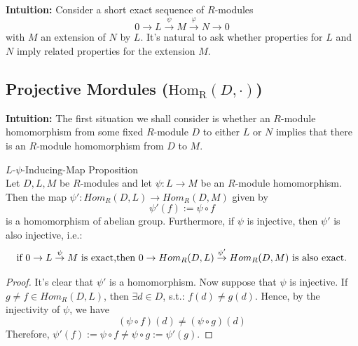 \noindent\textbf{Intuition:} Consider a short exact sequence of $R$-modules
$$0 \to L \overset{\psi}{\to} M \overset{\varphi}{\to} N \to 0$$
with $M$ an extension of $N$ by $L$. It's natural to ask whether properties for $L$ and $N$ imply related properties for the extension $M$.

\subsection{Projective Mordules ($\text{Hom}_\text{R}(D, \cdot)$)}

\noindent\textbf{Intuition:} The first situation we shall consider is whether an $R$-module homomorphism from some fixed $R$-module $D$ to either $L$ or $N$ implies that there is an $R$-module homomorphism from $D$ to $M$.

\begin{proposition}{$L$-$\psi$-Inducing-Map Proposition}\\
Let $D,L,M$ be $R$-modules and let $\psi: L \to M$ be an $R$-module homomorphism. Then the map $\psi': Hom_R(D,L) \to Hom_R(D,M)$ given by 
$$\psi' (f) := \psi \circ f$$
is a homomorphism of abelian group. Furthermore, if $\psi$ is injective, then $\psi'$ is also injective, i.e.:
\[
\text{if } 0 \overset{ }{\to} L \overset{\psi}{\to} M \text{ is exact,}\\
\text{then } 0\to Hom_R(D,L) \overset{\psi'}{\to} Hom_R(D,M) \text{ is also exact.}
\]
\end{proposition}

\begin{proof}
    It's clear that $\psi'$ is a homomorphism. Now suppose that $\psi$ is injective. If $g \neq f \in Hom_R(D,L)$, then $\exists d\in D$, s.t.: $f(d) \neq g(d)$. Hence, by the injectivity of $\psi$, we have
    $$(\psi \circ f) (d) \neq (\psi \circ g) (d)$$
    Therefore, $\psi' (f) := \psi \circ f \neq \psi \circ g :=\psi' (g)$.
\end{proof}

